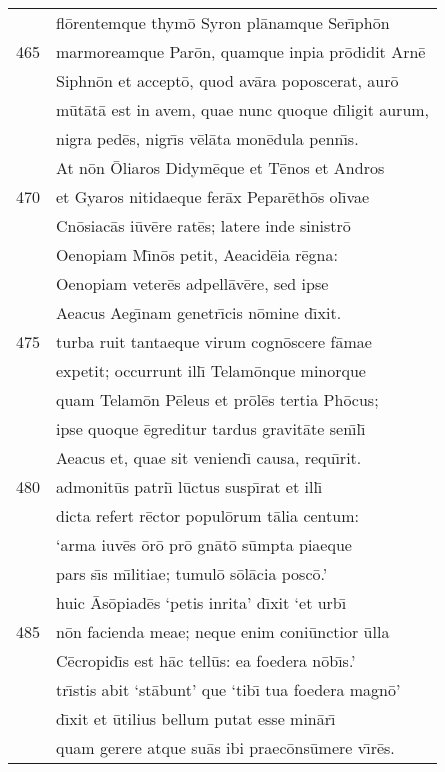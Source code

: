 \documentclass[paper=6in:9in,pagesize=pdftex,
               headinclude=on,footinclude=on,12pt]{scrbook}
\begin{document}
\begin{longtable}[p]{ r l }
 & fl\=orentemque thym\=o Syron pl\=anamque Ser\={\i}ph\=on\\ 
465 & marmoreamque Par\=on, quamque inpia pr\=odidit Arn\=e\\ 
 & Siphn\=on et accept\=o, quod av\=ara poposcerat, aur\=o\\ 
 & m\=ut\=at\=a est in avem, quae nunc quoque d\={\i}ligit aurum,\\ 
 & nigra ped\=es, nigr\={\i}s v\=el\=ata mon\=edula penn\={\i}s.\\ 
 & \indent At n\=on \=Oliaros Didym\=eque et T\=enos et Andros\\ 
470 & et Gyaros nitidaeque fer\=ax Pepar\=eth\=os ol\={\i}vae\\ 
 & Cn\=osiac\=as i\=uv\=ere rat\=es; latere inde sinistr\=o\\ 
 & Oenopiam M\={\i}n\=os petit, Aeacid\=eia r\=egna:\\ 
 & Oenopiam veter\=es adpell\=av\=ere, sed ipse\\ 
 & Aeacus Aeg\={\i}nam genetr\={\i}cis n\=omine d\={\i}xit.\\ 
475 & turba ruit tantaeque virum cogn\=oscere f\=amae\\ 
 & expetit; occurrunt ill\={\i} Telam\=onque minorque\\ 
 & quam Telam\=on P\=eleus et pr\=ol\=es tertia Ph\=ocus;\\ 
 & ipse quoque \=egreditur tardus gravit\=ate sen\={\i}l\={\i}\\ 
 & Aeacus et, quae sit veniend\={\i} causa, requ\={\i}rit.\\ 
480 & admonit\=us patri\={\i} l\=uctus susp\={\i}rat et ill\={\i}\\ 
 & dicta refert r\=ector popul\=orum t\=alia centum:\\ 
 & `arma iuv\=es \=or\=o pr\=o gn\=at\=o s\=umpta piaeque\\ 
 & pars s\={\i}s m\={\i}litiae; tumul\=o s\=ol\=acia posc\=o.'\\ 
 & huic \=As\=opiad\=es `petis inrita' d\={\i}xit `et urb\={\i}\\ 
485 & n\=on facienda meae; neque enim coni\=unctior \=ulla\\ 
 & C\=ecropid\={\i}s est h\=ac tell\=us: ea foedera n\=ob\={\i}s.'\\ 
 & tr\={\i}stis abit `st\=abunt' que `tib\={\i} tua foedera magn\=o'\\ 
 & d\={\i}xit et \=utilius bellum putat esse min\=ar\={\i}\\ 
 & quam gerere atque su\=as ibi praec\=ons\=umere v\={\i}r\=es.\\ 

\end{longtable}
\end{document}
